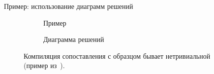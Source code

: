 \documentclass[aspectratio=169
  , xcolor={svgnames}
  , hyperref={ colorlinks,citecolor=Blue
             , linkcolor=DarkRed,urlcolor=DarkBlue}
  , russian
  ]{beamer}
\begin{document}
\begin{frame}[fragile]{Пример: использование диаграмм решений }
%
%

\begin{figure}[ht]
\begin{subfigure}[t]{0.25\linewidth}
\begin{minipage}{7cm}
\matchA
\end{minipage}
\caption{Пример}
\end{subfigure}
\hspace{0.5cm}
\begin{subfigure}[t]{0.32\linewidth}
\end{subfigure}
\hspace{0.5cm}
\begin{subfigure}[t]{0.3\linewidth}
\caption{Диаграмма решений}
\end{subfigure}
\caption{Компиляция сопоставления с образцом бывает нетривиальной (пример из~\cite{maranget2008}).}
\end{figure}
\end{frame}
\end{document}
